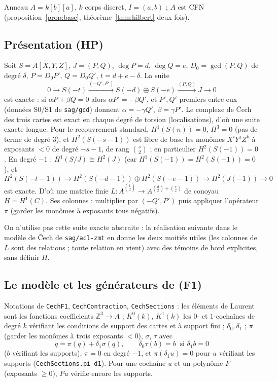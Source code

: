 \documentclass[11pt]{amsart}
\theoremstyle{definition}
\theoremstyle{remark}
\begin{document}
Anneau $A=k[b][a]$, $k$ corps discret, $I=(a,b)$ ; $A$ est CFN
(proposition~\ref{prop:base}, théorème~\ref{thm:hilbert} deux fois).

\subsection{Présentation (HP)}
Soit $S=A[X,Y,Z]$, $J=(P,Q)$, $\deg P=d$, $\deg Q=e$, $D_0=\gcd(P,Q)$ de
degré $\delta$, $P=D_0P'$, $Q=D_0Q'$, $t=d+e-\delta$. La suite
\[0\to S(-t)\xrightarrow{(-Q',P')}S(-d)\oplus S(-e)\xrightarrow{(P,Q)}J\to0\]
est exacte : si $\alpha P+\beta Q=0$ alors $\alpha P'=-\beta Q'$, et
$P',Q'$ premiers entre eux (données S0/S1 de \texttt{sag/gcd}) donnent
$\alpha=-\gamma Q'$, $\beta=\gamma P'$. Le complexe de Čech des trois
cartes est exact en chaque degré de torsion (localisations), d'où une
suite exacte longue. Pour le recouvrement standard,
$H^1(S(n))=0$, $H^3=0$ (pas de terme de degré 3), et $H^2(S(-s-1))$ est
libre de base les monômes $X^iY^jZ^k$ à exposants $<0$ de degré $-s-1$,
de rang $\binom s2$ ; en particulier $H^2(S(-1))=0$. En degré $-1$ :
$H^1(S/J)\cong H^2(J)$ (car $H^1(S(-1))=H^2(S(-1))=0$), et
\[H^2(S(-t-1))\to H^2(S(-d-1))\oplus H^2(S(-e-1))\to H^2(J(-1))\to0\]
est exacte. D'où une matrice finie
$L:A^{\binom t2}\to A^{\binom d2+\binom e2}$ de conoyau $H=H^1(C)$. Ses
colonnes : multiplier par $(-Q',P')$ puis appliquer l'opérateur $\pi$
(garder les monômes à exposants tous négatifs).

On n'utilise pas cette suite exacte abstraite : la réalisation suivante
dans le modèle de Čech de \texttt{sag/acl-zmt} en donne les deux moitiés
utiles (les colonnes de $L$ sont des relations ; toute relation en vient)
avec des témoins de bord explicites, sans définir $H$.

\subsection{Le modèle et les générateurs de (F1)}
Notations de \texttt{CechF1}, \texttt{CechContraction},
\texttt{CechSections} : les éléments de Laurent sont les fonctions
coefficients $\mathbb Z^3\to A$ ; $K^0(k)$, $K^1(k)$ les $0$- et
$1$-cochaînes de degré $k$ vérifiant les conditions de support des cartes
et à support fini ; $\delta_0,\delta_1$ ; $\pi$ (garder les monômes à trois
exposants $<0$), $\sigma$, $\tau$ avec
\[q=\pi(q)+\delta_1\sigma(q),\qquad \delta_0\tau(b)=b\ \text{ si }\delta_1b=0\]
($b$ vérifiant les supports), $\pi=0$ en degré $-1$, et
$\pi(\delta_1u)=0$ pour $u$ vérifiant les supports
(\texttt{CechSections.pi-d1}). Pour une cochaîne $u$ et un polynôme $F$
(exposants $\ge0$), $Fu$ vérifie encore les supports.
\end{document}
